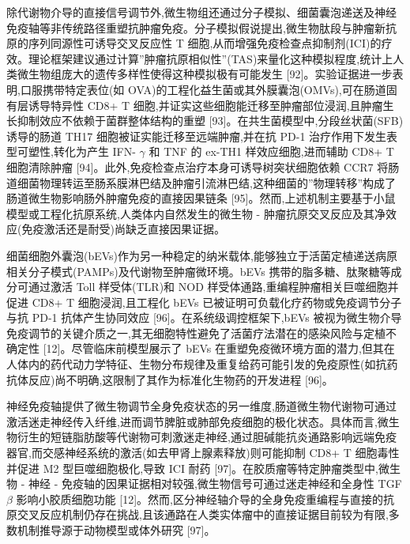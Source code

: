\documentclass[11pt]{article}
\begin{document}
除代谢物介导的直接信号调节外,微生物组还通过分子模拟、细菌囊泡递送及神经免疫轴等非传统路径重塑抗肿瘤免疫。分子模拟假说提出,微生物肽段与肿瘤新抗原的序列同源性可诱导交叉反应性 T 细胞,从而增强免疫检查点抑制剂(ICI)的疗效。理论框架建议通过计算''肿瘤抗原相似性''(TAS)来量化这种模拟程度,统计上人类微生物组庞大的遗传多样性使得这种模拟极有可能发生 {[}92{]}。实验证据进一步表明,口服携带特定表位(如 OVA)的工程化益生菌或其外膜囊泡(OMVs),可在肠道固有层诱导特异性 CD8+ T 细胞,并证实这些细胞能迁移至肿瘤部位浸润,且肿瘤生长抑制效应不依赖于菌群整体结构的重塑 {[}93{]}。在共生菌模型中,分段丝状菌(SFB)诱导的肠道 TH17 细胞被证实能迁移至远端肿瘤,并在抗 PD-1 治疗作用下发生表型可塑性,转化为产生 IFN- \(\gamma\) 和 TNF 的 ex-TH1 样效应细胞,进而辅助 CD8+ T 细胞清除肿瘤 {[}94{]}。此外,免疫检查点治疗本身可诱导树突状细胞依赖 CCR7 将肠道细菌物理转运至肠系膜淋巴结及肿瘤引流淋巴结,这种细菌的''物理转移''构成了肠道微生物影响肠外肿瘤免疫的直接因果链条 {[}95{]}。然而,上述机制主要基于小鼠模型或工程化抗原系统,人类体内自然发生的微生物 - 肿瘤抗原交叉反应及其净效应(免疫激活还是耐受)尚缺乏直接因果证据。

细菌细胞外囊泡(bEVs)作为另一种稳定的纳米载体,能够独立于活菌定植递送病原相关分子模式(PAMPs)及代谢物至肿瘤微环境。bEVs 携带的脂多糖、肽聚糖等成分可通过激活 Toll 样受体(TLR)和 NOD 样受体通路,重编程肿瘤相关巨噬细胞并促进 CD8+ T 细胞浸润,且工程化 bEVs 已被证明可负载化疗药物或免疫调节分子与抗 PD-1 抗体产生协同效应 {[}96{]}。在系统级调控框架下,bEVs 被视为微生物介导免疫调节的关键介质之一,其无细胞特性避免了活菌疗法潜在的感染风险与定植不确定性 {[}12{]}。尽管临床前模型展示了 bEVs 在重塑免疫微环境方面的潜力,但其在人体内的药代动力学特征、生物分布规律及重复给药可能引发的免疫原性(如抗药抗体反应)尚不明确,这限制了其作为标准化生物药的开发进程 {[}96{]}。

神经免疫轴提供了微生物调节全身免疫状态的另一维度,肠道微生物代谢物可通过激活迷走神经传入纤维,进而调节脾脏或肺部免疫细胞的极化状态。具体而言,微生物衍生的短链脂肪酸等代谢物可刺激迷走神经,通过胆碱能抗炎通路影响远端免疫器官,而交感神经系统的激活(如去甲肾上腺素释放)则可能抑制 CD8+ T 细胞毒性并促进 M2 型巨噬细胞极化,导致 ICI 耐药 {[}97{]}。在胶质瘤等特定肿瘤类型中,微生物 - 神经 - 免疫轴的因果证据相对较强,微生物信号可通过迷走神经和全身性 TGF \(\beta\) 影响小胶质细胞功能 {[}12{]}。然而,区分神经轴介导的全身免疫重编程与直接的抗原交叉反应机制仍存在挑战,且该通路在人类实体瘤中的直接证据目前较为有限,多数机制推导源于动物模型或体外研究 {[}97{]}。
\end{document}
